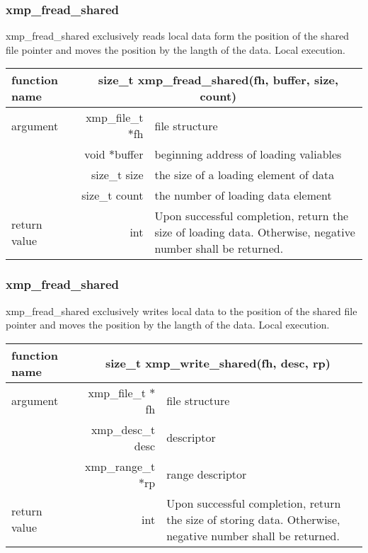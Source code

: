    \subsubsection{xmp\_fread\_shared}
   xmp\_fread\_shared exclusively reads local data form the position of the shared file
   pointer and moves the position by the langth of the data.
   Local execution.

   \begin{table}[h]
    \begin{center}
     \begin{tabular}{|l|r|p{80mm}|}
      \hline
      {\bf function name}  & \multicolumn{2}{c|}{\bf size\_t
      xmp\_fread\_shared(fh, buffer, size, count)}  \\ \hline \hline
      argument & xmp\_file\_t $*$fh & file structure \\ \cline{2-3}
      & void $*$buffer & beginning address of loading valiables \\ \cline{2-3}
      & size\_t size & the size of a loading element of data \\ \cline{2-3}
      & size\_t count & the number of loading data element \\ \hline
      return value & int & Upon successful completion, return the size
	      of loading data. Otherwise, negative number shall be
	      returned. \\ \hline
      \end{tabular}
     \end{center}
    \label{tb:aaa}
   \end{table}

   \subsubsection{xmp\_fread\_shared}
   xmp\_fread\_shared exclusively writes local data to the
   position of the shared file pointer and moves the position by the langth of the data.
   Local execution.

   \begin{table}[h]
    \begin{center}
     \begin{tabular}{|l|r|p{80mm}|}
      \hline
      {\bf function name}  & \multicolumn{2}{c|}{\bf size\_t
      xmp\_write\_shared(fh, desc, rp)} \\ \hline \hline
      argument & xmp\_file\_t $*$fh & file structure \\ \cline{2-3}
      & xmp\_desc\_t desc & descriptor \\ \cline{2-3}
      & xmp\_range\_t $*$rp & range descriptor \\ \hline
      return value & int & Upon successful completion, return the size
	      of storing data. Otherwise, negative number shall be
	      returned. \\ \hline
      \end{tabular}
     \end{center}
    \label{tb:aaa}
   \end{table}


